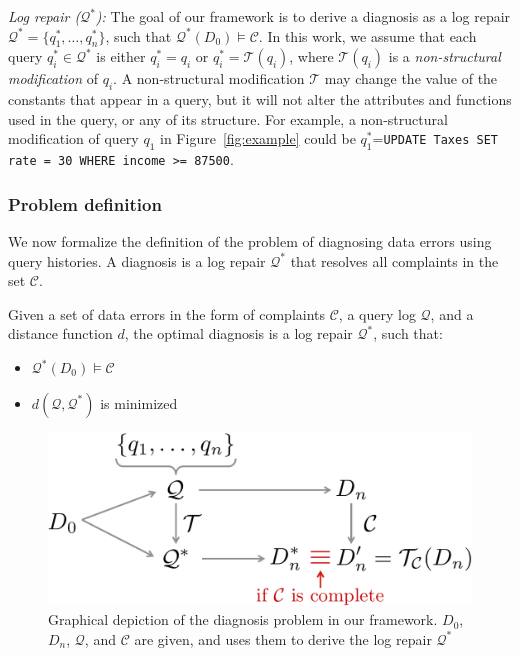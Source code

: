 \smallskip
\noindent
\emph{Log repair ($\mathcal{Q}^*$):}
The goal of our framework is to derive a diagnosis as a log repair
$\mathcal{Q}^*=\{q_1^*,\dots, q_n^*\}$, such that
$\mathcal{Q}^*(D_0)\models\mathcal{C}$. In this work, we assume that each
query $q_i^*\in\mathcal{Q}^*$ is either $q_i^*=q_i$ or
$q_i^*=\mathcal{T}(q_i)$, where $\mathcal{T}(q_i)$ is a \emph{non-structural
modification} of $q_i$.
A non-structural modification $\mathcal{T}$ may change the value of the
constants that appear in a query, but it will not alter the attributes and
functions used in the query, or any of its structure. For example, a
non-structural modification of query $q_1$ in Figure~\ref{fig:example} could
be $q_1^*$=\texttt{UPDATE Taxes SET rate = 30 WHERE income >= 87500}.


\subsubsection*{Problem definition}

We now formalize the definition of the problem of diagnosing data errors using
query histories. A diagnosis is a log repair $\mathcal{Q}^*$ that resolves all
complaints in the set $\mathcal{C}$.

\begin{definition}\label{def:problem}
    Given a set of data errors in the form of complaints $\mathcal{C}$, a query log $\mathcal{Q}$, and a distance function $d$, the optimal diagnosis is a log repair $\mathcal{Q}^*$, such that:
    \begin{itemize}[itemsep=0pt, parsep=0pt]
        \item $\mathcal{Q}^*(D_0)\models\mathcal{C}$
        \item $d(\mathcal{Q}, \mathcal{Q}^*)$ is minimized
    \end{itemize}
\end{definition}


\begin{figure}[t]
\centering
\includegraphics[width = 0.75\columnwidth]{figures/probtransform}
\caption{Graphical depiction of the diagnosis problem in our \sys framework.  $D_0$, $D_n$, $\mathcal{Q}$, and $\mathcal{C}$ are given, and \sys uses them to derive the log repair $\mathcal{Q}^*$}
\label{f:probtransform} 
\end{figure}


